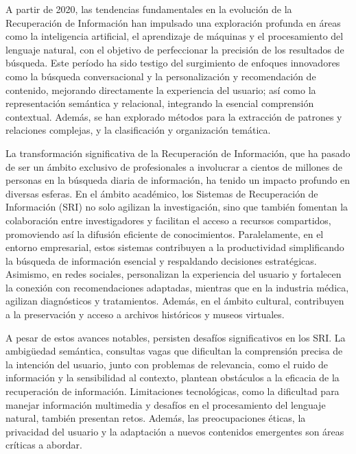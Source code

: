 A partir de 2020, las tendencias fundamentales en la evolución de la Recuperación de Información han impulsado una exploración profunda en áreas como la inteligencia artificial, el aprendizaje de máquinas y el procesamiento del lenguaje natural, con el objetivo de perfeccionar la precisión de los resultados de búsqueda. Este período ha sido testigo del surgimiento de enfoques innovadores como la búsqueda conversacional y la personalización y recomendación de contenido, mejorando directamente la experiencia del usuario; así como la representación semántica y relacional, integrando la esencial comprensión contextual. Además, se han explorado métodos para la extracción de patrones y relaciones complejas, y la clasificación y organización temática.

La transformación significativa de la Recuperaci\'on de Informaci\'on, que ha pasado de ser un ámbito exclusivo de profesionales a involucrar a cientos de millones de personas en la búsqueda diaria de información, ha tenido un impacto profundo en diversas esferas. En el ámbito académico, los  Sistemas de Recuperaci\'on de Informaci\'on (SRI) no solo agilizan la investigación, sino que también fomentan la colaboración entre investigadores y facilitan el acceso a recursos compartidos, promoviendo así la difusión eficiente de conocimientos. Paralelamente, en el entorno empresarial, estos sistemas contribuyen a la productividad simplificando la búsqueda de información esencial y respaldando decisiones estratégicas. Asimismo, en redes sociales, personalizan la experiencia del usuario y fortalecen la conexión con recomendaciones adaptadas, mientras que en la industria médica, agilizan diagnósticos y tratamientos. Además, en el ámbito cultural, contribuyen a la preservación y acceso a archivos históricos y museos virtuales. 

A pesar de estos avances notables, persisten desafíos significativos en los SRI. La ambigüedad semántica, consultas vagas que dificultan la comprensión precisa de la intención del usuario, junto con problemas de relevancia, como el ruido de información y la sensibilidad al contexto, plantean obstáculos a la eficacia de la recuperación de información. Limitaciones tecnológicas, como la dificultad para manejar información multimedia y desafíos en el procesamiento del lenguaje natural, también presentan retos. Además, las preocupaciones éticas, la privacidad del usuario y la adaptación a nuevos contenidos emergentes son áreas críticas a abordar. 

